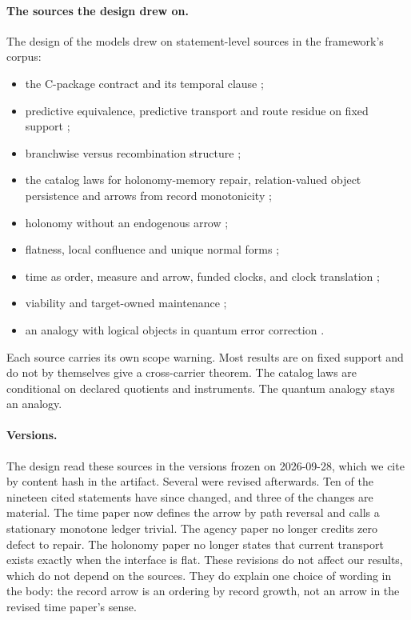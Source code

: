 \paragraph{The sources the design drew on.}
The design of the models drew on statement-level sources in the framework's
corpus:
\begin{itemize}
\item the C-package contract and its temporal clause
\citep{Tsiokos2026AuditedClosureArchitecture};
\item predictive equivalence, predictive transport and route residue on fixed
support \citep{Tsiokos2026HolonomyMemory};
\item branchwise versus recombination structure
\citep{Tsiokos2026MarkingErasure};
\item the catalog laws for holonomy-memory repair, relation-valued object
persistence and arrows from record monotonicity \citep{Tsiokos2026FoundationsIV};
\item holonomy without an endogenous arrow \citep{Tsiokos2026ProtocolTrap};
\item flatness, local confluence and unique normal forms
\citep{Tsiokos2026FlattenStone};
\item time as order, measure and arrow, funded clocks, and clock translation
\citep{Tsiokos2026NotchStone};
\item viability and target-owned maintenance \citep{Tsiokos2026Agenthood};
\item an analogy with logical objects in quantum error correction
\citep{Tsiokos2026QuantumErrorCorrection}.
\end{itemize}
Each source carries its own scope warning. Most results are on fixed support
and do not by themselves give a cross-carrier theorem. The catalog laws are
conditional on declared quotients and instruments. The quantum analogy stays
an analogy.

\paragraph{Versions.}
The design read these sources in the versions frozen on 2026-09-28, which we
cite by content hash in the artifact. Several were revised afterwards. Ten of
the nineteen cited statements have since changed, and three of the changes
are material. The time paper now defines the arrow by path reversal and calls
a stationary monotone ledger trivial. The agency paper no longer credits zero
defect to repair. The holonomy paper no longer states that current transport
exists exactly when the interface is flat. These revisions do not affect our
results, which do not depend on the sources. They do explain one choice of
wording in the body: the record arrow is an ordering by record growth, not an
arrow in the revised time paper's sense.


